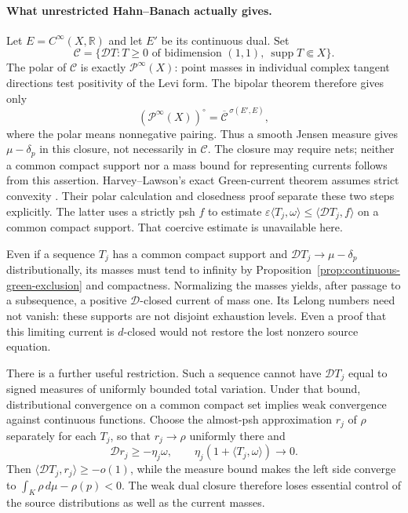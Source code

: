 \documentclass[11pt]{article}
\theoremstyle{remark}
\newcommand{\D}{\mathcal D}
\newcommand{\supp}{\operatorname{supp}}
\begin{document}
\paragraph{What unrestricted Hahn--Banach actually gives.}
Let $E=C^\infty(X,\mathbb R)$ and let $E'$ be its continuous dual.
Set
\[
 \mathcal C=\{\D T:T\ge0\text{ of bidimension }(1,1),
                                  \ \supp T\Subset X\}.
\]
The polar of $\mathcal C$ is exactly $\mathcal P^\infty(X)$: point masses
in individual complex tangent directions test positivity of the Levi
form. The bipolar theorem therefore gives only
\[
 (\mathcal P^\infty(X))^\circ
      =\overline{\mathcal C}^{\,\sigma(E',E)},
\]
where the polar means nonnegative pairing. Thus a smooth Jensen measure
gives $\mu-\delta_p$ in this closure, not necessarily in $\mathcal C$.
The closure may require nets; neither a common compact support nor a
mass bound for representing currents follows from this assertion.
Harvey--Lawson's exact Green-current theorem assumes strict convexity
\cite[Theorem~3.8]{HL}. Their polar calculation and closedness proof
\cite[Lemmas~3.10--3.11]{HL} separate these two steps explicitly.
The latter uses a strictly psh $f$ to estimate
$\varepsilon\langle T_j,\omega\rangle
 \le\langle\D T_j,f\rangle$ on a common compact support.
That coercive estimate is unavailable here.

Even if a sequence $T_j$ has a common compact support and
$\D T_j\to\mu-\delta_p$ distributionally, its masses must tend to
infinity by Proposition~\ref{prop:continuous-green-exclusion} and
compactness. Normalizing the masses yields, after passage to a
subsequence, a positive $\D$-closed current of mass one. Its Lelong
numbers need not vanish: these supports are not disjoint exhaustion
levels. Even a proof that this limiting current is $d$-closed would not
restore the lost nonzero source equation.

There is a further useful restriction. Such a sequence cannot have
$\D T_j$ equal to signed measures of uniformly bounded total variation.
Under that bound, distributional convergence on a common compact set
implies weak convergence against continuous functions. Choose the
almost-psh approximation $r_j$ of $\rho$ separately for each $T_j$, so
that $r_j\to\rho$ uniformly there and
\[
 \D r_j\ge-\eta_j\omega,
 \qquad \eta_j(1+\langle T_j,\omega\rangle)\longrightarrow0.
\]
Then $\langle\D T_j,r_j\rangle\ge-o(1)$, while the measure bound makes
the left side converge to $\int_K\rho\,d\mu-\rho(p)<0$.
The weak dual closure therefore loses essential control of the source
distributions as well as the current masses.
\end{document}
